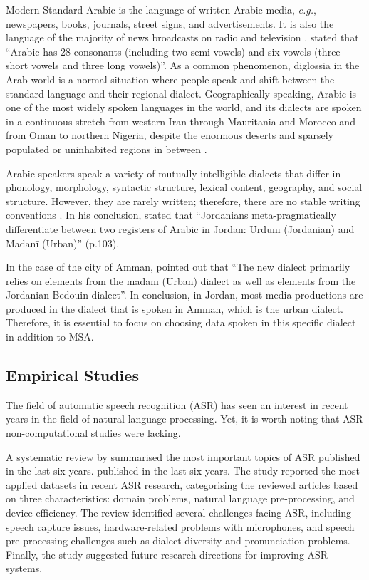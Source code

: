 \documentclass[english]{textolivre}
\begin{document}
Modern Standard Arabic is the language of written Arabic media,
\emph{e.g.}, newspapers, books, journals, street signs, and
advertisements. It is also the language of the majority of news
broadcasts on radio and television \cite{ryding_reference_2005}.
\textcite[p. 185]{sabir_brief_2014} stated that ``Arabic
has 28 consonants (including two semi-vowels) and six vowels (three
short vowels and three long vowels)''. As a common phenomenon,
diglossia in the Arab world is a normal situation where people speak and
shift between the standard language and their regional dialect.
Geographically speaking, Arabic is one of the most widely spoken
languages in the world, and its dialects are spoken in a continuous
stretch from western Iran through Mauritania and Morocco and from Oman
to northern Nigeria, despite the enormous deserts and sparsely populated
or uninhabited regions in between \cite{behnstedt_dialectology_2013}.

Arabic speakers speak a variety of mutually intelligible dialects that
differ in phonology, morphology, syntactic structure, lexical content,
geography, and social structure. However, they are rarely written;
therefore, there are no stable writing conventions \cite{maamouri_developing_2006}. In his conclusion,
\textcite{doughan_imaginaries_2017} stated that ``Jordanians
meta-pragmatically differentiate between two registers of Arabic in
Jordan: Urdunī (Jordanian) and Madanī (Urban)'' (p.103).

In the case of the city of Amman, \textcite[p. 325]{versteegh_encyclopedia_2006} pointed out that ``The new dialect primarily relies on elements
from the madanī (Urban) dialect as well as elements from the Jordanian
Bedouin dialect''. In conclusion, in Jordan, most media
productions are produced in the dialect that is spoken in Amman, which
is the urban dialect. Therefore, it is essential to focus on choosing
data spoken in this specific dialect in addition to MSA.

\subsection{Empirical Studies}\label{subsec-Empirical-Studies}
The field of automatic speech recognition (ASR) has seen an interest in
recent years in the field of natural language processing. Yet, it is
worth noting that ASR non-computational studies were lacking.

A systematic review by \textcite{alharbi_automatic_2021} summarised the most important topics of ASR published in the
last six years. published in the last six years. The study reported the
most applied datasets in recent ASR research, categorising the reviewed
articles based on three characteristics: domain problems, natural
language pre-processing, and device efficiency. The review identified
several challenges facing ASR, including speech capture issues,
hardware-related problems with microphones, and speech pre-processing
challenges such as dialect diversity and pronunciation problems.
Finally, the study suggested future research directions for improving
ASR systems.
\end{document}
